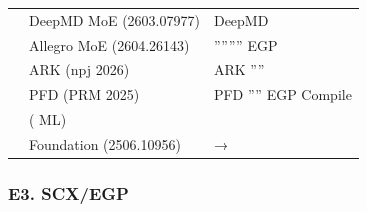 \documentclass[
  12pt,
]{article}
\begin{document}
\begin{longtable}[]{@{}
  >{\centering\arraybackslash}p{}
  >{\raggedright\arraybackslash}p{}
  >{\raggedright\arraybackslash}p{}@{}}
\toprule\noalign{}
\begin{minipage}[b]{\linewidth}\centering

\end{minipage} & \begin{minipage}[b]{\linewidth}\raggedright

\end{minipage} & \begin{minipage}[b]{\linewidth}\raggedright

\end{minipage} \\
\midrule\noalign{}
\endhead
\bottomrule\noalign{}
\endlastfoot
\textbf{} & DeepMD MoE (2603.07977) & DeepMD
 \\
\textbf{} & Allegro MoE (2604.26143) &
'''''''' EGP  \\
\textbf{} & ARK  (npj 2026) &  ARK
'''' \\
\textbf{} & PFD  (PRM 2025) &  PFD
'''' EGP  Compile  \\
\textbf{} &  ( ML) &
 \\
\textbf{} & Foundation  (2506.10956) &
→ \\
\end{longtable}

\subsubsection{E3. SCX/EGP
}\label{e3.-scxegp-ux5fc5ux987bux4e3bux52a8ux5360ux9886ux7684ux7a7aux767d}
\end{document}
